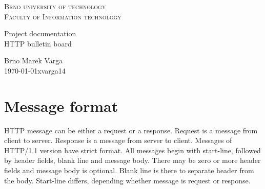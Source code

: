 \documentclass[11pt, a4paper]{article}
\begin{document}
	\begin{titlepage}
		\begin{center}

		\begin{figure}
		\centering
		\label{logo}
		\end{figure}

		{\huge \textsc{Brno university of technology\\ {\LARGE Faculty of Information technology\\}}}

		\LARGE Project documentation\\ {\Large HTTP bulletin board}
		\end{center}
	{\Large Brno \hfill Marek Varga \\}
	{\Large \today \hfill xvarga14}
	\end{titlepage}
	
	\newpage

	\tableofcontents

	\newpage
	\section{Message format}
	HTTP message can be either a request or a response. Request is a message from client to server. Response is a message from server to client. Messages of HTTP/1.1 		version have strict format. All messages begin with start-line, followed by header fields, blank line and message body.
	There may be zero or more header fields and message body is optional. Blank line is there to separate header from the body. Start-line differs, depending 		whether message is request or response.
\end{document}
